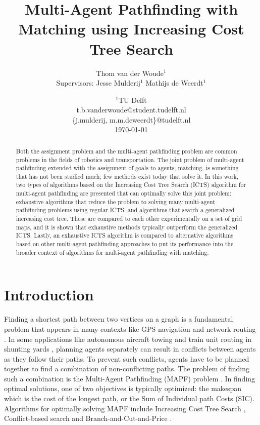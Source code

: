 \documentclass[english]{article}
\begin{document}
	
	\title{Multi-Agent Pathfinding with Matching using Increasing Cost Tree Search}
	\author{
		Thom van der Woude$^1$\\[2ex]
		\normalsize{Supervisors: Jesse Mulderij$^1$ Mathijs de Weerdt$^1$}
	}
	\date{
		$^1$TU Delft\\
		t.b.vanderwoude@student.tudelft.nl\\\{j.mulderij, m.m.deweerdt\}@tudelft.nl\\[2ex]
		\today
	}
	
	\maketitle
	
	\begin{abstract}
		\noindent Both the assignment problem and the multi-agent pathfinding problem are common problems in the fields of robotics and transportation. The joint problem of multi-agent pathfinding extended with the assignment of goals to agents, matching, is something that has not been studied much; few methods exist today that solve it. In this work, two types of algorithms based on the Increasing Cost Tree Search (ICTS) algorithm for multi-agent pathfinding are presented that can optimally solve this joint problem: exhaustive algorithms that reduce the problem to solving many multi-agent pathfinding problems using regular ICTS, and algorithms that search a generalized increasing cost tree. These are compared to each other experimentally on a set of grid maps, and it is shown that exhaustive methods typically outperform the generalized ICTS. Lastly, an exhaustive ICTS algorithm is compared to alternative algorithms based on other multi-agent pathfinding approaches to put its performance into the broader context of algorithms for multi-agent pathfinding with matching.
	\end{abstract}
	
	\section{Introduction}
	Finding a shortest path between two vertices on a graph is a fundamental problem that appears in many contexts like GPS navigation \cite{sturtevant2010} and network routing \cite{broch1998}. In some applications like autonomous aircraft towing \cite{morris2016} and train unit routing in shunting yards \cite{mulderij2020}, planning agents separately can result in conflicts between agents as they follow their paths. To prevent such conflicts, agents have to be planned together to find a combination of non-conflicting paths. The problem of finding such a combination is the Multi-Agent Pathfinding (MAPF) problem \cite{stern2019}. In finding optimal solutions, one of two objectives is typically optimized: the makespan which is the cost of the longest path, or the Sum of Individual path Costs (SIC). Algorithms for optimally solving MAPF include Increasing Cost Tree Search \cite{sharon2011}, Conflict-based search \cite{sharon2015} and Branch-and-Cut-and-Price \cite{lam2019}.
	
\end{document}
